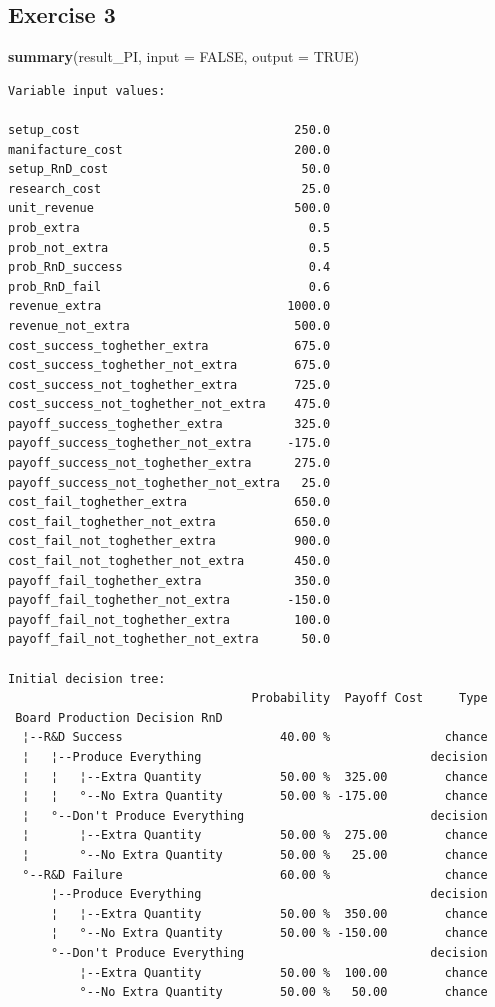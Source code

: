 \documentclass[]{article}
\newenvironment{Shaded}{\begin{snugshade}}{\end{snugshade}}
\newcommand{\KeywordTok}[1]{\textcolor[rgb]{0.13,0.29,0.53}{\textbf{#1}}}
\newcommand{\DataTypeTok}[1]{\textcolor[rgb]{0.13,0.29,0.53}{#1}}
\newcommand{\OtherTok}[1]{\textcolor[rgb]{0.56,0.35,0.01}{#1}}
\newcommand{\NormalTok}[1]{#1}
\begin{document}
\subsection{Exercise 3}\label{exercise-3}

\begin{Shaded}
\begin{Highlighting}[]
\KeywordTok{summary}\NormalTok{(result_PI, }\DataTypeTok{input =} \OtherTok{FALSE}\NormalTok{, }\DataTypeTok{output =} \OtherTok{TRUE}\NormalTok{)}
\end{Highlighting}
\end{Shaded}

\begin{verbatim}
Variable input values:
                                             
setup_cost                              250.0
manifacture_cost                        200.0
setup_RnD_cost                           50.0
research_cost                            25.0
unit_revenue                            500.0
prob_extra                                0.5
prob_not_extra                            0.5
prob_RnD_success                          0.4
prob_RnD_fail                             0.6
revenue_extra                          1000.0
revenue_not_extra                       500.0
cost_success_toghether_extra            675.0
cost_success_toghether_not_extra        675.0
cost_success_not_toghether_extra        725.0
cost_success_not_toghether_not_extra    475.0
payoff_success_toghether_extra          325.0
payoff_success_toghether_not_extra     -175.0
payoff_success_not_toghether_extra      275.0
payoff_success_not_toghether_not_extra   25.0
cost_fail_toghether_extra               650.0
cost_fail_toghether_not_extra           650.0
cost_fail_not_toghether_extra           900.0
cost_fail_not_toghether_not_extra       450.0
payoff_fail_toghether_extra             350.0
payoff_fail_toghether_not_extra        -150.0
payoff_fail_not_toghether_extra         100.0
payoff_fail_not_toghether_not_extra      50.0

Initial decision tree:
                                  Probability  Payoff Cost     Type
 Board Production Decision RnD                                     
  ¦--R&D Success                      40.00 %                chance
  ¦   ¦--Produce Everything                                decision
  ¦   ¦   ¦--Extra Quantity           50.00 %  325.00        chance
  ¦   ¦   °--No Extra Quantity        50.00 % -175.00        chance
  ¦   °--Don't Produce Everything                          decision
  ¦       ¦--Extra Quantity           50.00 %  275.00        chance
  ¦       °--No Extra Quantity        50.00 %   25.00        chance
  °--R&D Failure                      60.00 %                chance
      ¦--Produce Everything                                decision
      ¦   ¦--Extra Quantity           50.00 %  350.00        chance
      ¦   °--No Extra Quantity        50.00 % -150.00        chance
      °--Don't Produce Everything                          decision
          ¦--Extra Quantity           50.00 %  100.00        chance
          °--No Extra Quantity        50.00 %   50.00        chance


\end{verbatim}
\end{document}
